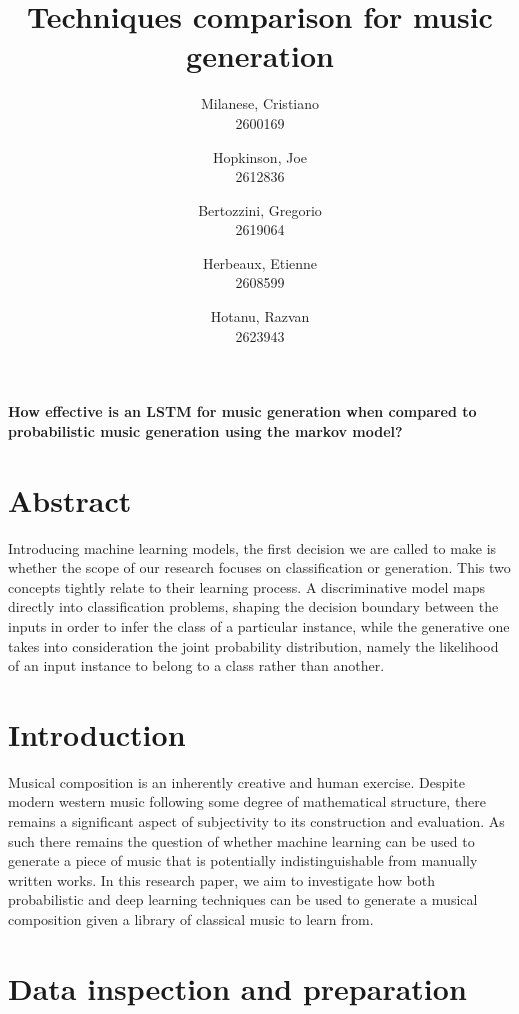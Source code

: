 \documentclass[12pt]{article}
\title{\Huge \textbf{Techniques comparison for music generation}}
\author{
      \small Milanese, Cristiano \\ \small 2600169
      \and
      \small Hopkinson, Joe \\ \small 2612836
      \and
      \small Bertozzini, Gregorio \\ \small 2619064
      \and
      \small Herbeaux, Etienne \\ \small 2608599
      \and
      \small Hotanu, Razvan \\ \small 2623943
}
\date{}
\begin{document}
\maketitle
\paragraph{How effective is an LSTM for music generation when compared to \\ probabilistic music generation using the markov model?}
\vspace{10pt}
\section*{Abstract}
  Introducing machine learning models, the first decision we are called to make is whether the scope of our research focuses on classification or generation. This two concepts tightly relate to their learning process. A discriminative model maps directly into classification problems, shaping the decision boundary between the inputs in order to infer the class of a particular instance, while the generative one takes into consideration the joint probability distribution, namely the likelihood of an input instance to belong to a class rather than another.
\section*{Introduction}
   Musical composition is an inherently creative and human exercise. Despite modern western music following some degree of mathematical structure, there remains a significant aspect of subjectivity to its construction and evaluation. As such there remains the question of whether machine learning can be used to generate a piece of music that is potentially indistinguishable from manually written works. In this research paper, we aim to investigate how both probabilistic and deep learning techniques can be used to generate a musical composition given a library of classical music to learn from.
\section*{Data inspection and preparation}
\end{document}
